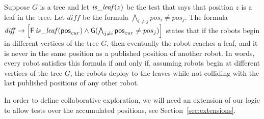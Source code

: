 \begin{example} \label{ex:RLTL-deploy}
 Suppose $G$ is a tree and let $\mathit{is\_leaf}(z)$ be the test that says that position $z$ is a leaf in the tree.
 Let $\mathit{diff}$ be the formula $\bigwedge_{i \neq j} pos_i \neq pos_j$.
The \RLTL formula $\mathit{diff} \rightarrow\left[\operatorname{\mathsf{F}} \mathit{is\_leaf}(\mathsf{pos}_{cur}) \wedge \operatorname{\mathsf{G}}(\bigwedge_{j\neq i} \mathsf{pos}_{cur} \neq pos_j)\right]$
states that if the robots begin in different vertices of the tree $G$, then
eventually the robot reaches a leaf, and it is never in the same position as a published position of another robot.
In words, every robot satisfies this formula if and only if, assuming robots begin at different vertices of the tree $G$, the robots deploy to the leaves while not colliding with the last published positions of any other robot.
%
%
\end{example}

In order to define collaborative exploration, we will need an extension of our logic to allow tests over the accumulated positions, see Section~\ref{sec:extensions}.




